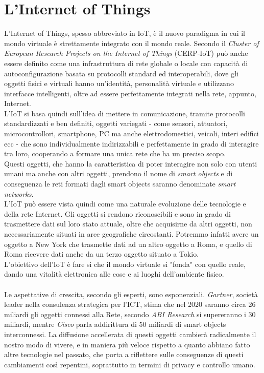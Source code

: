 \chapter{L'Internet of Things}
L'Internet of Things, spesso abbreviato in IoT, è il nuovo paradigma in cui il mondo virtuale è strettamente integrato con il mondo reale. Secondo il \textit{Cluster of European Research Projects on the Internet of Things} (CERP-IoT) può anche essere definito come una infrastruttura di rete globale o locale con capacità di autoconfigurazione basata su protocolli standard ed interoperabili, dove gli oggetti fisici e virtuali hanno un'identità, personalità virtuale e utilizzano interfacce intelligenti, oltre ad essere perfettamente integrati nella rete, appunto, Internet.
\\L'IoT si basa quindi sull'idea di mettere in comunicazione, tramite protocolli standardizzati e ben definiti, oggetti variegati - come sensori, attuatori, microcontrollori, smartphone, PC ma anche elettrodomestici, veicoli, interi edifici ecc - che sono individualmente indirizzabili e perfettamente in grado di interagire tra loro, cooperando a formare una unica rete che ha un preciso scopo.
\\Questi oggetti, che hanno la caratteristica di poter interagire non solo con utenti umani ma anche con altri oggetti, prendono il nome di \textit{smart objects} e di conseguenza le reti formati dagli smart objects saranno denominate \textit{smart networks}.
\\L'IoT può essere vista quindi come una naturale evoluzione delle tecnologie e della rete Internet. Gli oggetti si rendono riconoscibili e sono in grado di trasmettere dati sul loro stato attuale, oltre che acquisirne da altri oggetti, non necessariamente situati in aree geografiche circostanti. Potremmo infatti avere un oggetto a New York che trasmette dati ad un altro oggetto a Roma, e quello di Roma ricevere dati anche da un terzo oggetto situato a Tokio.
\\L'obiettivo dell'IoT è fare si che il mondo virtuale si "fonda" con quello reale, dando una vitalità elettronica alle cose e ai luoghi dell'ambiente fisico.
\\\\Le aspettative di crescita, secondo gli esperti, sono esponenziali. \textit{Gartner}, società leader nella consulenza strategica per l'ICT, stima che nel 2020 saranno circa 26 miliardi gli oggetti connessi alla Rete, secondo \textit{ABI Research} si supereranno i 30 miliardi, mentre \textit{Cisco} parla addirittura di 50 miliardi di smart objects interconnessi. La diffusione accellerata di questi oggetti cambierà radicalmente il nostro modo di vivere, e in maniera più veloce rispetto a quanto abbiano fatto altre tecnologie nel passato, che porta a riflettere sulle conseguenze di questi cambiamenti così repentini, soprattutto in termini di privacy e controllo umano.
